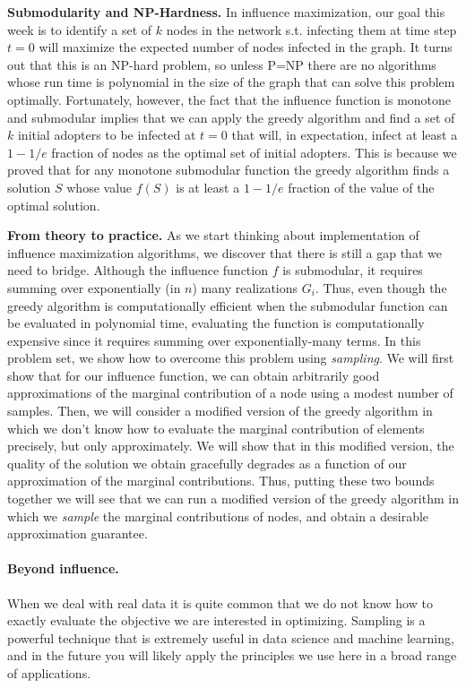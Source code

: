 \documentclass[11pt]{article}
\begin{document}
	\textbf{Submodularity and NP-Hardness.} In influence maximization, our goal this week is to identify a set of $k$ nodes in the network s.t. infecting them at time step $t=0$ will maximize the expected number of nodes infected in the graph.  It turns out that this is an NP-hard problem, so unless P=NP there are no algorithms whose run time is polynomial in the size of the graph that can solve this problem optimally.  Fortunately, however, the fact that the influence function is monotone and submodular implies that we can apply the greedy algorithm and find a set of $k$ initial adopters to be infected at $t=0$ that will, in expectation, infect at least a $1-1/e$ fraction of nodes as the optimal set of initial adopters.  This is because we proved that for any monotone submodular function the greedy algorithm finds a solution $S$ whose value $f(S)$ is at least a $1-1/e$ fraction of the value of the optimal solution.
	
	\textbf{From theory to practice.}  As we start thinking about implementation of influence maximization algorithms, we discover that there is still a gap that we need to bridge.  Although the influence function $f$ is submodular, it requires summing over exponentially (in $n$) many realizations $G_{i}$.  Thus, even though the greedy algorithm is computationally efficient when the submodular function can be evaluated in polynomial time, evaluating the function is computationally expensive since it requires summing over exponentially-many terms.  In this problem set, we show how to overcome this problem using \emph{sampling}.  We will first show that for our influence function, we can obtain arbitrarily good approximations of the marginal contribution of a node using a modest number of samples.  Then, we will consider a modified version of the greedy algorithm in which we don't know how to evaluate the marginal contribution of elements precisely, but only approximately.  We will show that in this modified version, the quality of the solution we obtain gracefully degrades as a function of our approximation of the marginal contributions.  Thus, putting these two bounds together we will see that we can run a modified version of the greedy algorithm in which we \emph{sample} the marginal contributions of nodes, and obtain a desirable approximation guarantee.
	
	\paragraph{Beyond influence.}  When we deal with real data it is quite common that we do not know how to exactly evaluate the objective we are interested in optimizing.  Sampling is a powerful technique that is extremely useful in data science and machine learning, and in the future you will likely apply the principles we use here in a broad range of applications.\newline 
	
\end{document}
